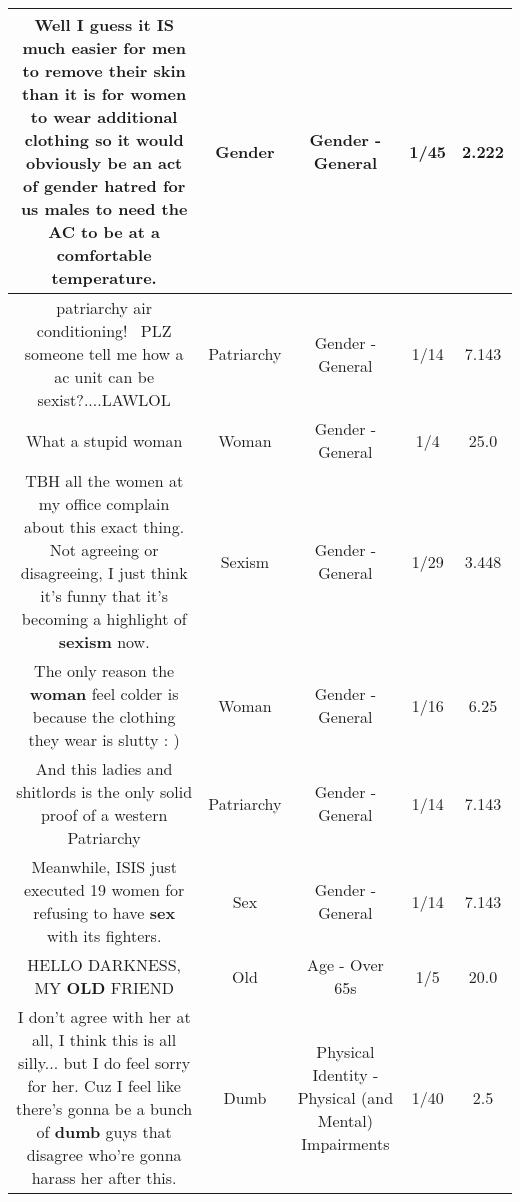 \documentclass[11pt]{article}
\newlength\mylength
\begin{document}
\begin{center}
\begin{longtable}{|C{.65\mylength}|C{.30\mylength}|C{.12\mylength}|C{.12\mylength}|C{.12\mylength}|}
  \small Well I guess it IS much easier for men to remove their skin than it is for women to wear additional clothing so it would obviously be an act of \textbf{gender} hatred for us males to need the AC to be at a comfortable temperature.\normalsize   & Gender & Gender - General & 1/45 & 2.222 \\  \hline
  \small patriarchy air conditioning!  PLZ someone tell me how a ac unit can be sexist?....LAWLOL\normalsize   & Patriarchy & Gender - General & 1/14 & 7.143 \\  \hline
  \small What a stupid woman\normalsize   & Woman & Gender - General & 1/4 & 25.0 \\  \hline
  \small TBH all the women at my office complain about this exact thing. Not agreeing or disagreeing, I just think it's funny that it's becoming a highlight of \textbf{sexism} now.\normalsize   & Sexism & Gender - General & 1/29 & 3.448 \\  \hline
  \small The only reason the \textbf{woman} feel colder is because the clothing they wear is slutty : )\normalsize   & Woman & Gender - General & 1/16 & 6.25 \\  \hline
  \small And this ladies and shitlords is the only solid proof of a western Patriarchy\normalsize   & Patriarchy & Gender - General & 1/14 & 7.143 \\  \hline
  \small Meanwhile, ISIS just executed 19 women for refusing to have \textbf{sex} with its fighters.\normalsize   & Sex & Gender - General & 1/14 & 7.143 \\  \hline
  \small HELLO DARKNESS, MY \textbf{OLD} FRIEND\normalsize   & Old & Age - Over 65s & 1/5 & 20.0 \\  \hline
  \small I don't agree with her at all, I think this is all silly... but I do feel sorry for her. Cuz I feel like there's gonna be a bunch of \textbf{dumb} guys that disagree who're gonna harass her after this.\normalsize   & Dumb & Physical Identity - Physical (and Mental) Impairments & 1/40 & 2.5 \\  \hline

\end{longtable}
\end{center}
\end{document}
